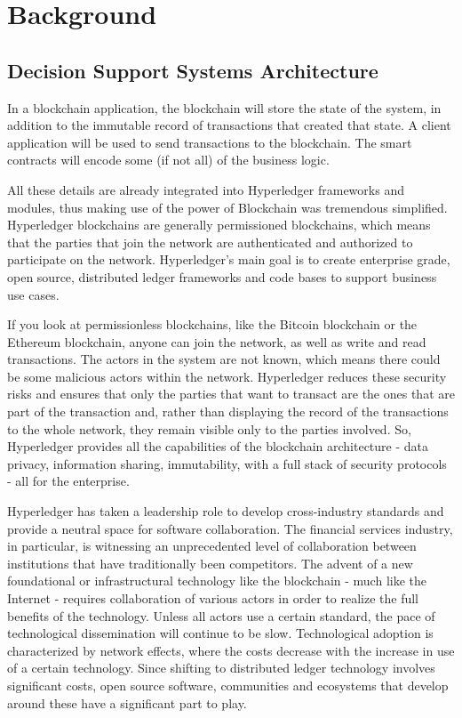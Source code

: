 \chapter{Background}
\label{chapter:chapter2}

\section{Decision Support Systems Architecture}
\label{sec:ch3-sec}
In a blockchain application, the blockchain will store the state of the system, in addition to the immutable record of transactions that created that state. A client application will be used to send transactions to the blockchain. The smart contracts will encode some (if not all) of the business logic.

All these details are already integrated into Hyperledger frameworks and modules, thus making use of the power of Blockchain was tremendous simplified.
Hyperledger blockchains are generally permissioned blockchains, which means that the parties that join the network are authenticated and authorized to participate on the network. Hyperledger’s main goal is to create enterprise grade, open source, distributed ledger frameworks and code bases to support business use cases.

If you look at permissionless blockchains, like the Bitcoin blockchain or the Ethereum blockchain, anyone can join the network, as well as write and read transactions. The actors in the system are not known, which means there could be some malicious actors within the network.
Hyperledger reduces these security risks and ensures that only the parties that want to transact are the ones that are part of the transaction and, rather than displaying the record of the transactions to the whole network, they remain visible only to the parties involved. So, Hyperledger provides all the capabilities of the blockchain architecture - data privacy, information sharing, immutability, with a full stack of security protocols - all for the enterprise.

Hyperledger has taken a leadership role to develop cross-industry standards and provide a neutral space for software collaboration. The financial services industry, in particular, is witnessing an unprecedented level of collaboration between institutions that have traditionally been competitors. The advent of a new foundational or infrastructural technology like the blockchain - much like the Internet - requires collaboration of various actors in order to realize the full benefits of the technology. Unless all actors use a certain standard, the pace of technological dissemination will continue to be slow. Technological adoption is characterized by network effects, where the costs decrease with the increase in use of a certain technology. Since shifting to distributed ledger technology involves significant costs, open source software, communities and ecosystems that develop around these have a significant part to play.

